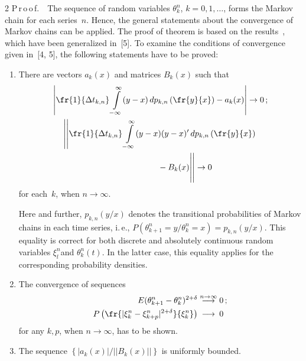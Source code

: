 \begin{multicols}{2}
\noindent 
P\,r\,o\,o\,f.\ \ 
The sequence of random variables $\theta_{k}^{n} $, $k$\linebreak $=0,1,\dots$,  
forms the Markov chain for each series~$n$. Hence, the general statements 
about the convergence of Markov chains can be applied. The proof of theorem 
is based on the results~\cite{4-b}, which have been generalized in~[5]. To examine the 
conditions 
of convergence given in~[4, 5], the following statements have to be proved:
\begin{enumerate}[I]
\item  There are vectors $a_{k} (x)$ and matrices $B_{k} (x)$ such that
\begin{gather*}
\left\vert\fr{1}{\Delta t_{k,n} } \int\limits_{-\infty }^{\infty }(y-x)\,dp_{k,n}  
\left(\fr{y}{x}\right)-a_{k} (x)\right\vert\to 0\,;
\\
\left\vert\left\vert\fr{1}{\Delta t_{k,n} }
 \int\limits_{-\infty }^{\infty }(y-x)(y-x)'\,dp_{k,n}  \left(\fr{y}{x}\right)\right.\right.\\
\hspace*{20mm}\left.\left. {}-B_{k} (x)
\vphantom{\int\limits_\infty^\infty}\right\vert\right\vert\to 0
\end{gather*}
for each~$k$, when $n \rightarrow \infty$.

Here and further, $p_{k,n} (y/x)$ denotes the transitional 
probabilities of Markov chains in each time series, i.\,e., 
$P(\theta_{k+1}^{n} =y/\theta_{k}^{n} =x)=p_{k,n} (y/x)$. 
This equality is correct for both discrete and absolutely continuous random 
variables $\xi_{l}^{n} $and $\theta_{k}^{n} (t)$. In the latter case, this equality 
applies for the corresponding probability densities.

\item
The convergence of sequences
\begin{align*}
E(\theta_{k+1}^{n} -\theta_{k}^{n} )^{2+\delta } & \stackrel{n\to \infty }{\longrightarrow} 0\,;
\\
P\left(\fr{|\xi_{k}^{n} -\xi_{k+p}^{n} |^{2+\delta } }{\xi_{k}^{n}} \right)&
\stackrel{\hphantom{n\to \infty}}{\longrightarrow} 0
\end{align*}
for any $k, p$, when $n \rightarrow \infty$, has to be shown.
\item
The sequence 
$
\left\{ {|a_{k} (x)|}/{||B_{k} (x)||} \right\}$ 
is uniformly bounded.
\end{enumerate}



\end{multicols}
